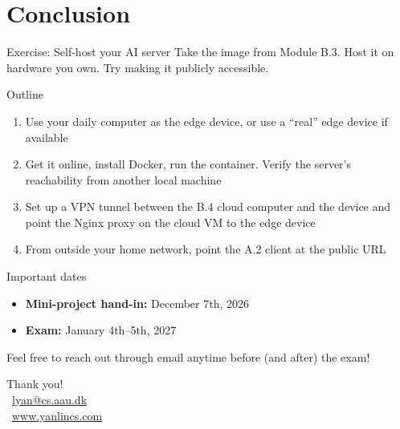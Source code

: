 \documentclass[aspectratio=169]{beamer}
\begin{document}
\section{Conclusion}

\begin{frame}{Exercise: Self-host your AI server}
    Take the image from Module B.3. Host it on hardware you own. Try making it publicly accessible.

    \begin{block}{Outline}
        \begin{enumerate}
            \item Use your daily computer as the edge device, or use a ``real'' edge device if available
            \item Get it online, install Docker, run the container. Verify the server's reachability from another local machine
            \item Set up a VPN tunnel between the B.4 cloud computer and the device and point the Nginx proxy on the cloud VM to the edge device
            \item From outside your home network, point the A.2 client at the public URL
        \end{enumerate}
    \end{block}
\note{
}
\end{frame}


\begin{frame}{Important dates}
  \begin{itemize}
    \item \textbf{Mini-project hand-in:} December 7th, 2026
    \item \textbf{Exam:} January 4th--5th, 2027
  \end{itemize}

  \vspace{1em}
  Feel free to reach out through email anytime before (and after) the exam!
\note{
}
\end{frame}


\appendix

\begin{frame}
\begin{center}
{\large Thank you!}
\vspace{1cm}
\\[0.5em]
{\small \faEnvelope\ \href{mailto:lyan@cs.aau.dk}{lyan@cs.aau.dk} \\
\faGlobe\ \href{https://www.yanlincs.com}{www.yanlincs.com}}
\end{center}
\note{
}
\end{frame}
\end{document}
